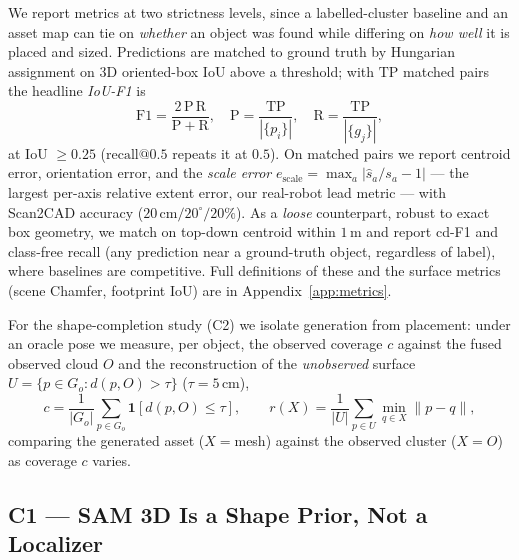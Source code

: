 \documentclass[conference]{IEEEtran}
\begin{document}
We report metrics at two strictness levels, since a labelled-cluster baseline
and an asset map can tie on \emph{whether} an object was found while differing on
\emph{how well} it is placed and sized. Predictions are matched to ground truth
by Hungarian assignment on 3D oriented-box IoU above a threshold; with
$\mathrm{TP}$ matched pairs the headline \emph{IoU-F1} is
\begin{equation}
  \mathrm{F1}=\frac{2\,\mathrm{P}\,\mathrm{R}}{\mathrm{P}+\mathrm{R}},\quad
  \mathrm{P}=\frac{\mathrm{TP}}{|\{p_i\}|},\quad
  \mathrm{R}=\frac{\mathrm{TP}}{|\{g_j\}|},
\end{equation}
at IoU $\ge 0.25$ ($\text{recall@}0.5$ repeats it at $0.5$). On matched pairs we
report centroid error, orientation error, and the \emph{scale error}
$e_{\text{scale}}=\max_a|\hat{s}_a/s_a-1|$ --- the largest per-axis relative
extent error, our real-robot lead metric --- with Scan2CAD accuracy
($20\,\text{cm}/20^\circ/20\%$). As a \emph{loose} counterpart, robust to exact
box geometry, we match on top-down centroid within $1\,\text{m}$ and report cd-F1
and class-free recall (any prediction near a ground-truth object, regardless of
label), where baselines are competitive. Full definitions of these and the
surface metrics (scene Chamfer, footprint IoU) are in
Appendix~\ref{app:metrics}.

For the shape-completion study (C2) we isolate generation from placement: under
an oracle pose we measure, per object, the observed coverage $c$ against the
fused observed cloud $O$ and the reconstruction of the \emph{unobserved} surface
$U=\{p\in G_o: d(p,O)>\tau\}$ ($\tau=5\,\text{cm}$),
\begin{equation}
  c=\frac{1}{|G_o|}\!\sum_{p\in G_o}\!\mathbf{1}[d(p,O)\le\tau],\qquad
  r(X)=\frac{1}{|U|}\!\sum_{p\in U}\min_{q\in X}\lVert p-q\rVert,
  \label{eq:unobs}
\end{equation}
comparing the generated asset ($X{=}$mesh) against the observed cluster
($X{=}O$) as coverage $c$ varies.

\subsection{C1 --- SAM 3D Is a Shape Prior, Not a Localizer}
\end{document}
